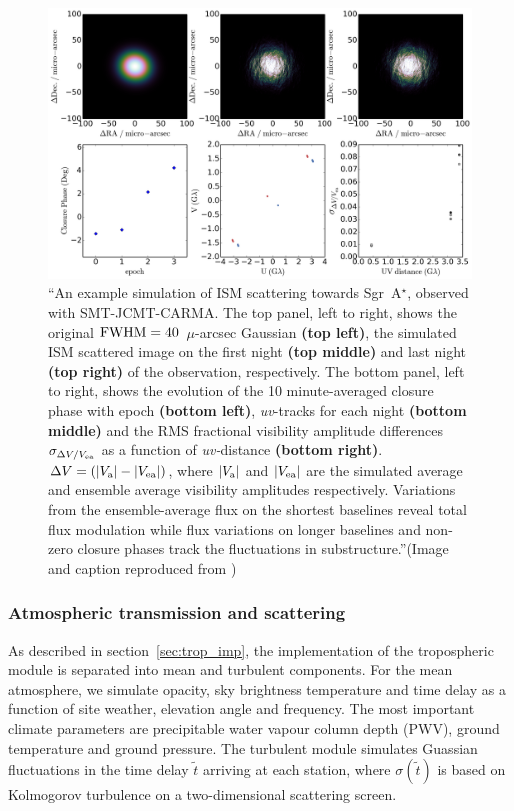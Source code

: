 \begin{figure}[h!]
\includegraphics[width=\columnwidth]{Images/ism}
\caption{``An example simulation of ISM scattering towards Sgr~A$^{\star}$, observed with SMT-JCMT-CARMA.  The top panel, left to right, shows the original $\rm FWHM = 40$~$\mu$-arcsec Gaussian {\bf (top left)}, the simulated ISM scattered image on the first night {\bf (top middle)} and last night {\bf (top right)} of the observation, respectively.  The bottom panel, left to right,  shows the evolution of the 10 minute-averaged closure phase with epoch {\bf (bottom left)}, {\sl uv}-tracks for each night {\bf (bottom middle)} and the RMS fractional visibility amplitude differences $\sigma_{\Delta V /V_{\rm ea}}$ as a function of {\sl uv-}distance {\bf (bottom right)}. $ \Delta V= (|V_{\rm a}|-|V_{\rm ea}|)$, where $|V_{\rm a}|$ and $|V_{\rm ea}|$ are the simulated average and ensemble average visibility amplitudes respectively. Variations from the ensemble-average flux on the shortest baselines reveal total flux modulation while flux variations on longer baselines and non-zero closure phases track the fluctuations in substructure.''(Image and caption reproduced from \citet{Blecher_2016}) \label{ISM_sequence}%
}
\end{figure}

\subsubsection{Atmospheric transmission and scattering}

As described in section~\ref{sec:trop_imp}, the implementation of the tropospheric module is separated into mean and turbulent components. For the mean atmosphere, we simulate opacity, sky brightness temperature and time delay as a function of site weather, elevation angle and frequency. The most important climate parameters are precipitable water vapour column depth (PWV), ground temperature and ground pressure. The turbulent module simulates Guassian fluctuations in the time delay $\tilde{t}$ arriving at each station, where $\sigma(\tilde{t})$ is based on Kolmogorov turbulence on a two-dimensional scattering screen.


